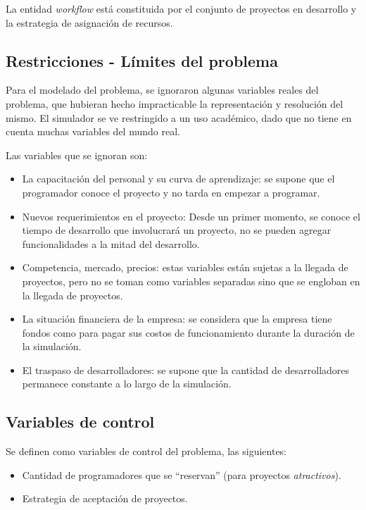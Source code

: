 La entidad \textit{workflow} está constituida por el conjunto de proyectos en desarrollo y la estrategia de asignación de recursos.\\

\subsection{Restricciones - Límites del problema}

Para el modelado del problema, se ignoraron algunas variables reales del problema, que hubieran hecho impracticable la representación y resolución del mismo. El simulador se ve 
restringido a un uso académico, dado que no tiene en cuenta muchas variables del mundo real.

Las variables que se ignoran son: \\

\begin{itemize}
    \item La capacitación del personal y su curva de aprendizaje: se supone que el programador conoce el proyecto y no tarda en empezar a programar.
    \item Nuevos requerimientos en el proyecto: Desde un primer momento, se conoce el tiempo de desarrollo que involucrará un proyecto, no se pueden agregar 
            funcionalidades a la mitad del desarrollo.
    \item Competencia, mercado, precios: estas variables están sujetas a la llegada de proyectos, pero no se toman como variables separadas sino que se engloban en la 
        llegada de proyectos.
    \item La situación financiera de la empresa: se considera que la empresa tiene fondos como para pagar sus costos de funcionamiento durante la duración de la simulación.
    \item El traspaso de desarrolladores: se supone que la cantidad de desarrolladores permanece constante a lo largo de la simulación.
\end{itemize}

\subsection{Variables de control}
Se definen como variables de control del problema, las siguientes:

\begin{itemize}
    \item Cantidad de programadores que se ``reservan'' (para proyectos \textit{atractivos}).
    \item Estrategia de aceptación de proyectos.
\end{itemize}

